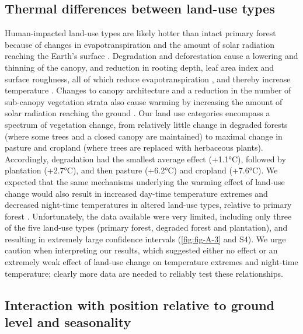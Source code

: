 \documentclass[12pt,a4paper,]{report}
\theoremstyle{definition}
\theoremstyle{definition}
\theoremstyle{definition}
\theoremstyle{remark}
\begin{document}
\subsection{Thermal differences between land-use
types}\label{thermal-differences-between-land-use-types}

Human-impacted land-use types are likely hotter than intact primary
forest because of changes in evapotranspiration and the amount of solar
radiation reaching the Earth's surface
\citep{oke_boundary_1987, findell_modeled_2007, davin_climatic_2010}.
Degradation and deforestation cause a lowering and thinning of the
canopy, and reduction in rooting depth, leaf area index and surface
roughness, all of which reduce evapotranspiration
\citep{okuda_effect_2003, snyder_analyzing_2004, kumar_effects_2005, findell_modeled_2007, davin_climatic_2010, hardwick_relationship_2015},
and thereby increase temperature
\citep{oke_boundary_1987, foley_global_2005}. Changes to canopy
architecture and a reduction in the number of sub-canopy vegetation
strata also cause warming by increasing the amount of solar radiation
reaching the ground \citep{oke_boundary_1987, murcia_edge_1995}. Our
land use categories encompass a spectrum of vegetation change, from
relatively little change in degraded forests (where some trees and a
closed canopy are maintained) to maximal change in pasture and cropland
(where trees are replaced with herbaceous plants). Accordingly,
degradation had the smallest average effect (+1.1°C), followed by
plantation (+2.7°C), and then pasture (+6.2°C) and cropland (+7.6°C). We
expected that the same mechanisms underlying the warming effect of
land-use change would also result in increased day-time temperature
extremes and decreased night-time temperatures in altered land-use
types, relative to primary forest
\citep{oke_boundary_1987, chen_growing-season_1995}. Unfortunately, the
data available were very limited, including only three of the five
land-use types (primary forest, degraded forest and plantation), and
resulting in extremely large confidence intervals (\autoref{fig:fig-A-3}
and S4). We urge caution when interpreting our results, which suggested
either no effect or an extremely weak effect of land-use change on
temperature extremes and night-time temperature; clearly more data are
needed to reliably test these relationships.

\subsection{Interaction with position relative to ground level and
seasonality}\label{interaction-with-position-relative-to-ground-level-and-seasonality}
\end{document}
